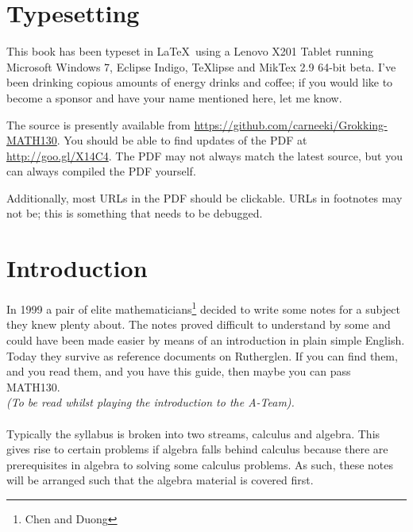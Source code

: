 \section{Typesetting}
This book has been typeset in \LaTeX~using a Lenovo X201 Tablet running
Microsoft Windows 7, Eclipse Indigo, TeXlipse and MikTex 2.9 64-bit beta. I've
been drinking copious amounts of energy drinks and coffee; if you would like to
become a sponsor and have your name mentioned here, let me know.

The source is presently available from
\url{https://github.com/carneeki/Grokking-MATH130}. You should be able to find
updates of the PDF at \url{http://goo.gl/X14C4}. The PDF may not always match
the latest source, but you can always compiled the PDF yourself.

Additionally, most URLs in the PDF should be clickable. URLs in footnotes may
not be; this is something that needs to be debugged.

\section{Introduction}
\label{sec:Introduction}
In 1999 a pair of elite mathematicians\footnote{Chen and Duong} decided to
write some notes for a subject they knew plenty about. The notes proved
difficult to understand by some and could have been made easier by means of an
introduction in plain simple English. Today they survive as reference documents
on Rutherglen. If you can find them, and you read them, and you have this
guide, then maybe you can pass MATH130.\\
\emph{(To be read whilst playing the introduction to the A-Team).}\\
\\
Typically the syllabus is broken into two streams, calculus and algebra. This
gives rise to certain problems if algebra falls behind calculus because
there are prerequisites in algebra to solving some calculus problems. As such,
these notes will be arranged such that the algebra material is covered first.